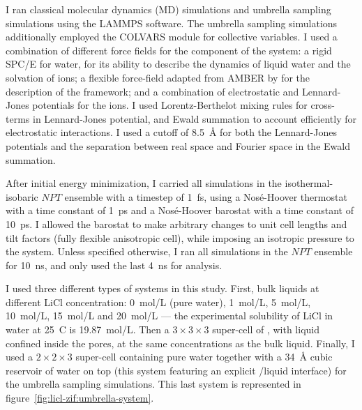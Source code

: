 \documentclass[thesis]{subfiles}
\begin{document}
I ran classical molecular dynamics (MD) simulations and umbrella sampling
simulations using the LAMMPS\cite{Plimpton1993} software. The umbrella sampling
simulations additionally employed the COLVARS\cite{Fiorin2013} module for
collective variables. I used a combination of different force fields for the
component of the system: a rigid SPC/E\cite{Berendsen1987} for water, for its
ability to describe the dynamics of liquid water and the solvation of ions; a
flexible force-field adapted from AMBER by
\citeauthor{Zheng2012}\cite{Zheng2012} for the description of the 
framework; and a combination of electrostatic and Lennard-Jones potentials for
the ions\cite{Chowdhuri2003}. I used Lorentz-Berthelot mixing rules for
cross-terms in Lennard-Jones potential, and Ewald summation to account
efficiently for electrostatic interactions. I used a cutoff of \SI{8.5}{\AA} for
both the Lennard-Jones potentials and the separation between real space and
Fourier space in the Ewald summation.

After initial energy minimization, I carried all simulations in the
isothermal-isobaric $NPT$ ensemble with a timestep of \SI{1}{fs}, using a
Nosé-Hoover thermostat with a time constant of \SI{1}{ps} and a Nosé-Hoover
barostat with a time constant of \SI{10}{ps}. I allowed the barostat to make
arbitrary changes to unit cell lengths and tilt factors (fully flexible
anisotropic cell), while imposing an isotropic pressure to the system. Unless
specified otherwise, I ran all simulations in the $NPT$ ensemble for
\SI{10}{ns}, and only used the last \SI{4}{ns} for analysis.

I used three different types of systems in this study. First, bulk liquids at
different LiCl concentration: \SI{0}{mol/L} (pure water), \SI{1}{mol/L},
\SI{5}{mol/L}, \SI{10}{mol/L}, \SI{15}{mol/L} and \SI{20}{mol/L} --- the
experimental solubility of LiCl in water at 25~{\textdegree C} is
\SI{19.87}{mol/L}. Then a $3\times3\times3$ super-cell of , with liquid
confined inside the pores, at the same concentrations as the bulk liquid.
Finally, I used a $2\times2\times3$  super-cell containing pure water
together with a \SI{34}{\AA} cubic reservoir of water on top (this system
featuring an explicit /liquid interface) for the umbrella sampling
simulations. This last system is represented in
figure~\ref{fig:licl-zif:umbrella-system}.
\end{document}
